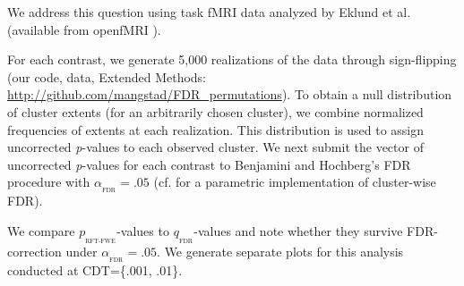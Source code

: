 \documentclass[9pt,twocolumn,twoside]{pnas-new}
\newcommand{\subtext}[2]{
#1_{_{\text{#2}}}
}
\begin{document}
We address this question using task fMRI data \cite{duncan_consistency_2009,tom_neural_2007} analyzed by Eklund et al. (available from openfMRI \cite{poldrack_toward_2013}).

For each contrast, we generate 5,000 realizations of the data through sign-flipping (our code, data, Extended Methods: \url{http://github.com/mangstad/FDR_permutations}).
To obtain a null distribution of cluster extents (for an arbitrarily chosen cluster), we combine normalized frequencies of extents at each realization.
This distribution is used to assign uncorrected \textit{p}-values to each observed cluster. 
We next submit the vector of uncorrected \textit{p}-values for each contrast to Benjamini and Hochberg's \cite{benjamini_controlling_1995} FDR procedure with $\subtext{\alpha}{FDR}=.05$ (cf. \cite{chumbley_false_2009} for a parametric implementation of cluster-wise FDR).
 
We compare $\subtext{p}{RFT-FWE}$-values to $\subtext{q}{FDR}$-values and note whether they survive FDR-correction under $\subtext{\alpha}{FDR}=.05$. 
We generate separate plots for this analysis conducted at CDT=\{.001, .01\}.
\end{document}
